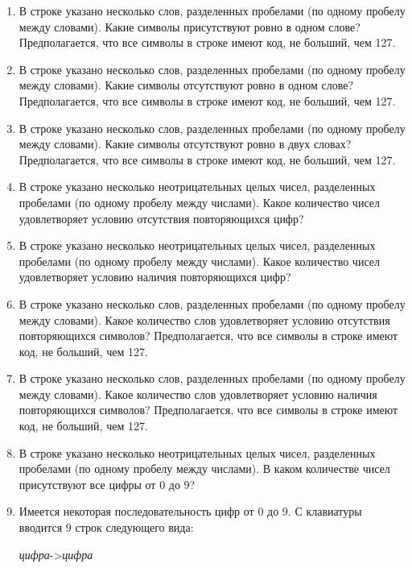 \begin{enumerate}
\item В строке указано несколько слов, разделенных пробелами (по одному
пробелу между словами). Какие символы присутствуют ровно в одном слове?
Предполагается, что все символы в строке имеют код, не больший, чем 127.


\item В строке указано несколько слов, разделенных пробелами (по одному
пробелу между словами). Какие символы отсутствуют ровно в одном слове?
Предполагается, что все символы в строке имеют код, не больший, чем 127.

\item В строке указано несколько слов, разделенных пробелами (по одному
пробелу между словами). Какие символы отсутствуют ровно в двух словах?
Предполагается, что все символы в строке имеют код, не больший, чем 127.



\item В строке указано несколько неотрицательных целых чисел, разделенных пробелами (по одному
пробелу между числами). Какое количество чисел удовлетворяет условию отсутствия
повторяющихся цифр? 

\item В строке указано несколько неотрицательных целых чисел, разделенных пробелами (по одному
пробелу между числами). Какое количество чисел удовлетворяет условию наличия
повторяющихся цифр? 

\item В строке указано несколько слов, разделенных пробелами (по одному
пробелу между словами). Какое количество слов удовлетворяет условию отсутствия
повторяющихся символов? 
Предполагается, что все символы в строке имеют код, не больший, чем 127.


\item В строке указано несколько слов, разделенных пробелами (по одному
пробелу между словами). Какое количество слов удовлетворяет условию наличия
повторяющихся символов? 
Предполагается, что все символы в строке имеют код, не больший, чем 127.


\item В строке указано несколько неотрицательных целых чисел, разделенных пробелами (по одному
пробелу между числами). В каком количестве чисел присутствуют все цифры от
0 до 9?

\item Имеется некоторая последовательность цифр от $0$ до $9$. 
С клавиатуры вводится $9$ строк следующего вида:

\textit{цифра}->\textit{цифра}


\end{enumerate}
